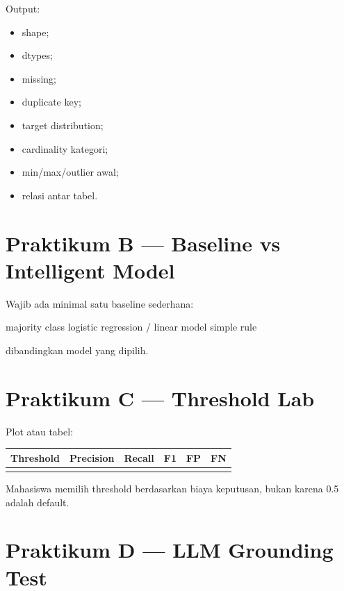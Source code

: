 \documentclass[
  indonesian,
  letterpaper,
  DIV=11,
  numbers=noendperiod]{scrreprt}
\newenvironment{Shaded}{\begin{snugshade}}{\end{snugshade}}
\newcommand{\NormalTok}[1]{\textcolor[rgb]{0.00,0.23,0.31}{#1}}
\newcounter{none} %
\providecommand{\tightlist}{%
  \setlength{\itemsep}{0pt}\setlength{\parskip}{0pt}}
\begin{document}
Output:

\begin{itemize}
\tightlist
\item
  shape;
\item
  dtypes;
\item
  missing;
\item
  duplicate key;
\item
  target distribution;
\item
  cardinality kategori;
\item
  min/max/outlier awal;
\item
  relasi antar tabel.
\end{itemize}

\section{Praktikum B --- Baseline vs Intelligent
Model}\label{praktikum-b-baseline-vs-intelligent-model}

Wajib ada minimal satu baseline sederhana:

\begin{Shaded}
\begin{Highlighting}[]
\NormalTok{majority class}
\NormalTok{logistic regression / linear model}
\NormalTok{simple rule}
\end{Highlighting}
\end{Shaded}

dibandingkan model yang dipilih.

\section{Praktikum C --- Threshold Lab}\label{praktikum-c-threshold-lab}

Plot atau tabel:

{\def\LTcaptype{none} %
\begin{longtable}[]{@{}rrrrrr@{}}
\toprule\noalign{}
Threshold & Precision & Recall & F1 & FP & FN \\
\midrule\noalign{}
\endhead
\bottomrule\noalign{}
\endlastfoot
\end{longtable}
}

Mahasiswa memilih threshold berdasarkan biaya keputusan, bukan karena
0.5 adalah default.

\section{Praktikum D --- LLM Grounding
Test}\label{praktikum-d-llm-grounding-test}
\end{document}
